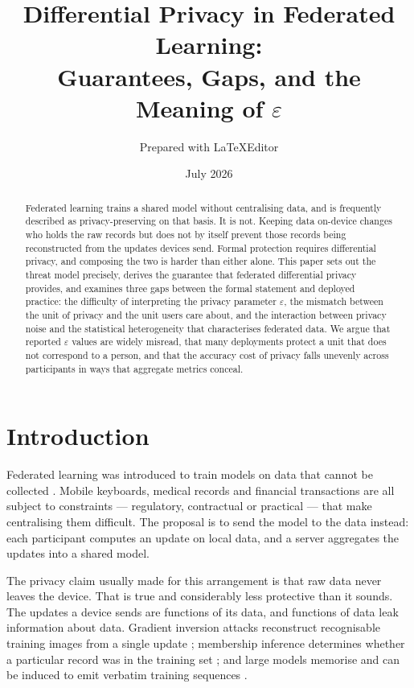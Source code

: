 \documentclass[11pt,a4paper]{article}
\title{Differential Privacy in Federated Learning:\\
       Guarantees, Gaps, and the Meaning of $\varepsilon$}
\author{Prepared with LaTeXEditor}
\date{July 2026}
\begin{document}
\maketitle

\begin{abstract}
Federated learning trains a shared model without centralising data, and is
frequently described as privacy-preserving on that basis. It is not. Keeping
data on-device changes who holds the raw records but does not by itself
prevent those records being reconstructed from the updates devices send.
Formal protection requires differential privacy, and composing the two is
harder than either alone. This paper sets out the threat model precisely,
derives the guarantee that federated differential privacy provides, and
examines three gaps between the formal statement and deployed practice: the
difficulty of interpreting the privacy parameter $\varepsilon$, the mismatch
between the unit of privacy and the unit users care about, and the interaction
between privacy noise and the statistical heterogeneity that characterises
federated data. We argue that reported $\varepsilon$ values are widely
misread, that many deployments protect a unit that does not correspond to a
person, and that the accuracy cost of privacy falls unevenly across
participants in ways that aggregate metrics conceal.
\end{abstract}

\tableofcontents

\section{Introduction}
\label{sec:intro}

Federated learning was introduced to train models on data that cannot be
collected \cite{mcmahan2017}. Mobile keyboards, medical records and financial
transactions are all subject to constraints --- regulatory, contractual or
practical --- that make centralising them difficult. The proposal is to send
the model to the data instead: each participant computes an update on local
data, and a server aggregates the updates into a shared model.

The privacy claim usually made for this arrangement is that raw data never
leaves the device. That is true and considerably less protective than it
sounds. The updates a device sends are functions of its data, and functions of
data leak information about data. Gradient inversion attacks reconstruct
recognisable training images from a single update \cite{zhu2019}; membership
inference determines whether a particular record was in the training set
\cite{shokri2017}; and large models memorise and can be induced to emit
verbatim training sequences \cite{carlini2019, carlini2021}.
\end{document}
